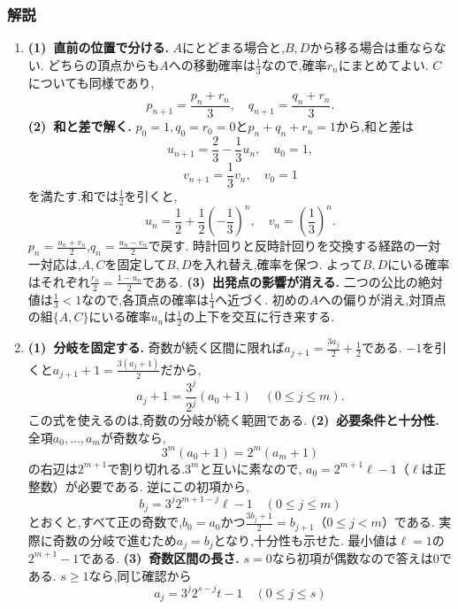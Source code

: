 \subsubsection{解説}\label{節：発展：解説}
\begin{enumerate}[label=\textbf{問\arabic*.},leftmargin=3.8em,format=\bookitemlink{practice-entrance}{solution}{problem}]
  \item \textbf{(1)~直前の位置で分ける.}
    $A$にとどまる場合と,$B,D$から移る場合は重ならない.
    どちらの頂点からも$A$への移動確率は$\frac{1}{3}$なので,確率$r_n$にまとめてよい.
    $C$についても同様であり,
    \[
      p_{n+1}=\frac{p_n+r_n}3,\quad q_{n+1}=\frac{q_n+r_n}3.
    \]
    \smallskip\textbf{(2)~和と差で解く.}
    $p_0=1,q_0=r_0=0$と$p_n+q_n+r_n=1$から,和と差は
    \[
      u_{n+1}=\frac23-\frac13u_n,\quad u_0=1,
    \]
    \[
      v_{n+1}=\frac13v_n,\quad v_0=1
    \]
    を満たす.和では$\frac{1}{2}$を引くと,
    \[
      u_n=\frac12+\frac12\left(-\frac13\right)^n,\quad
      v_n=\left(\frac13\right)^n.
    \]
    $p_n=\frac{u_n+v_n}{2}$,$q_n=\frac{u_n-v_n}{2}$で戻す.
    時計回りと反時計回りを交換する経路の一対一対応は,$A,C$を固定して$B,D$を入れ替え,確率を保つ.
    よって$B,D$にいる確率はそれぞれ$\frac{r_n}{2}=\frac{1-u_n}{2}$である.
    \smallskip\textbf{(3)~出発点の影響が消える.}
    二つの公比の絶対値は$\frac{1}{3}<1$なので,各頂点の確率は$\frac{1}{4}$へ近づく.
    初めの$A$への偏りが消え,対頂点の組$\{A,C\}$にいる確率$u_n$は$\frac{1}{2}$の上下を交互に行き来する.
  \item \textbf{(1)~分岐を固定する.}
    奇数が続く区間に限れば$a_{j+1}=\frac{3a_j}{2}+\frac{1}{2}$である.
    $-1$を引くと$a_{j+1}+1=\frac{3(a_j+1)}{2}$だから,
    \[
      a_j+1=\frac{3^j}{2^j}(a_0+1)\quad(0\le j\le m).
    \]
    この式を使えるのは,奇数の分岐が続く範囲である.
    \smallskip\textbf{(2)~必要条件と十分性.}
    全項$a_0,\ldots,a_m$が奇数なら,
    \[
      3^m(a_0+1)=2^m(a_m+1)
    \]
    の右辺は$2^{m+1}$で割り切れる.$3^m$と互いに素なので,
    $a_0=2^{m+1}\ell-1$（$\ell$は正整数）が必要である.
    逆にこの初項から,
    \[
      b_j=3^j2^{m+1-j}\ell-1\quad(0\le j\le m)
    \]
    とおくと,すべて正の奇数で,$b_0=a_0$かつ$\frac{3b_j+1}{2}=b_{j+1}$（$0\le j<m$）である.
    実際に奇数の分岐で進むため$a_j=b_j$となり,十分性も示せた.
    最小値は$\ell=1$の$2^{m+1}-1$である.
    \smallskip\textbf{(3)~奇数区間の長さ.}
    $s=0$なら初項が偶数なので答えは$0$である.
    $s\ge1$なら,同じ確認から
    \[
      a_j=3^j2^{s-j}t-1\quad(0\le j\le s)
\]
\end{enumerate}

